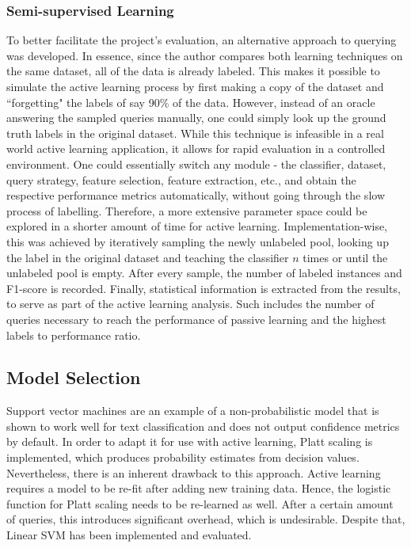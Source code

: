\documentclass[a4paper,12pt]{article}
\begin{document}
\subsubsection{Semi-supervised Learning}
To better facilitate the project's evaluation, an alternative approach to querying was developed. In essence, since the author compares both learning techniques on the same dataset, all of the data is already labeled. This makes it possible to simulate the active learning process by first making a copy of the dataset and ``forgetting" the labels of say 90\% of the data. However, instead of an oracle answering the sampled queries manually, one could simply look up the ground truth labels in the original dataset. While this technique is infeasible in a real world active learning application, it allows for rapid evaluation in a controlled environment. One could essentially switch any module - the classifier, dataset, query strategy, feature selection, feature extraction, etc., and obtain the respective performance metrics automatically, without going through the slow process of labelling. Therefore, a more extensive parameter space could be explored in a shorter amount of time for active learning.
Implementation-wise, this was achieved by iteratively sampling the newly unlabeled pool, looking up the label in the original dataset and teaching the classifier $n$ times or until the unlabeled pool is empty. After every sample, the number of labeled instances and F1-score is recorded. Finally, statistical information is extracted from the results, to serve as part of the active learning analysis. Such includes the number of queries necessary to reach the performance of passive learning and the highest labels to performance ratio.
\subsection{Model Selection}
Support vector machines are an example of a non-probabilistic model that is shown to work well for text classification and does not output confidence metrics by default. In order to adapt it for use with active learning, Platt scaling \cite{Platt99probabilisticoutputs} is implemented, which produces probability estimates from decision values. Nevertheless, there is an inherent drawback to this approach. Active learning requires a model to be re-fit after adding new training data. Hence, the logistic function for Platt scaling needs to be re-learned as well. After a certain amount of queries, this introduces significant overhead, which is undesirable. Despite that, Linear SVM has been implemented and evaluated.
\end{document}
